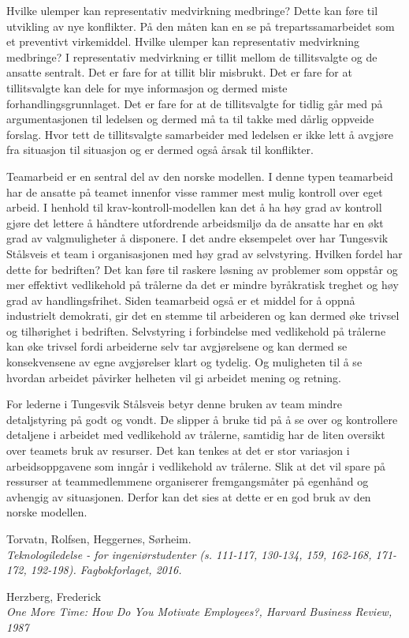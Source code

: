 \documentclass[norsk]{article}
\begin{document}
Hvilke ulemper kan representativ medvirkning medbringe? Dette kan føre til utvikling av nye konflikter. På den måten kan en se på trepartssamarbeidet som et preventivt virkemiddel. Hvilke ulemper kan representativ medvirkning medbringe? I representativ medvirkning er tillit mellom de tillitsvalgte og de ansatte sentralt. Det er fare for at tillit blir misbrukt. Det er fare for at tillitsvalgte kan dele for mye informasjon og dermed miste forhandlingsgrunnlaget. Det er fare for at de tillitsvalgte for tidlig går med på argumentasjonen til ledelsen og dermed må ta til takke med dårlig oppveide forslag. Hvor tett de tillitsvalgte samarbeider med ledelsen er ikke lett å avgjøre fra situasjon til situasjon og er dermed også årsak til konflikter.  

Teamarbeid er en sentral del av den norske modellen. I denne typen teamarbeid har de ansatte på teamet innenfor visse rammer mest mulig kontroll over eget arbeid. I henhold til krav-kontroll-modellen kan det å ha høy grad av kontroll gjøre det lettere å håndtere utfordrende arbeidsmiljø da de ansatte har en økt grad av valgmuligheter å disponere. I det andre eksempelet over har Tungesvik Stålsveis et team i organisasjonen med høy grad av selvstyring. Hvilken fordel har dette for bedriften? Det kan føre til raskere løsning av problemer som oppstår og mer effektivt vedlikehold på trålerne da det er mindre byråkratisk treghet og høy grad av handlingsfrihet. Siden teamarbeid også er et middel for å oppnå industrielt demokrati, gir det en stemme til arbeideren og kan dermed øke trivsel og tilhørighet i bedriften. Selvstyring i forbindelse med vedlikehold på trålerne kan øke trivsel fordi arbeiderne selv tar avgjørelsene og kan dermed se konsekvensene av egne avgjørelser klart og tydelig. Og muligheten til å se hvordan arbeidet påvirker helheten vil gi arbeidet mening og retning. 

For lederne i Tungesvik Stålsveis betyr denne bruken av team mindre detaljstyring på godt og vondt. De slipper å bruke tid på å se over og kontrollere detaljene i arbeidet med vedlikehold av trålerne, samtidig har de liten oversikt over teamets bruk av resurser. Det kan tenkes at det er stor variasjon i arbeidsoppgavene som inngår i vedlikehold av trålerne. Slik at det vil spare på ressurser at teammedlemmene organiserer fremgangsmåter på egenhånd og avhengig av situasjonen. Derfor kan det sies at dette er en god bruk av den norske modellen. 


\newpage
\begin{thebibliography}{9}

Torvatn, Rolfsen, Heggernes, Sørheim. 
\\\textit{Teknologiledelse - for ingeniørstudenter
(s. 111-117, 130-134, 159, 162-168, 171-172, 192-198). Fagbokforlaget, 2016.}

Herzberg, Frederick 
\\\textit{One More Time: How Do You Motivate Employees?, Harvard Business Review, 1987}

\end{thebibliography}
\end{document}
